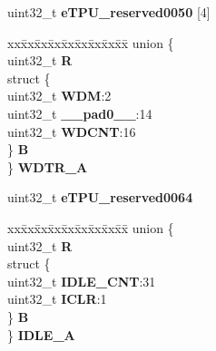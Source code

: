 \begin{DoxyCompactItemize}
\begin{tabbing}
\end{tabbing}\item 
\mbox{\label{structETPU__tag_af12f172b5ea96051013a7c295518d737}} 
uint32\+\_\+t {\bfseries e\+T\+P\+U\+\_\+reserved0050} \mbox{[}4\mbox{]}
\item 
\mbox{\label{structETPU__tag_a9e0bb85c822f6a9f2c32391faf8353b8}} 
\begin{tabbing}
xx\=xx\=xx\=xx\=xx\=xx\=xx\=xx\=xx\=\kill
union \{\\
\>uint32\_t {\bfseries R}\\
\>struct \{\\
\>\>uint32\_t {\bfseries WDM}:2\\
\>\>uint32\_t {\bfseries \_\_pad0\_\_}:14\\
\>\>uint32\_t {\bfseries WDCNT}:16\\
\>\} {\bfseries B}\\
\} {\bfseries WDTR\_A}\\

\end{tabbing}\item 
\mbox{\label{structETPU__tag_af4e785fc7450a16d4077cc53f24f361f}} 
uint32\+\_\+t {\bfseries e\+T\+P\+U\+\_\+reserved0064}
\item 
\mbox{\label{structETPU__tag_a223ec22c9f0ffb2708d12fecfa3572d3}} 
\begin{tabbing}
xx\=xx\=xx\=xx\=xx\=xx\=xx\=xx\=xx\=\kill
union \{\\
\>uint32\_t {\bfseries R}\\
\>struct \{\\
\>\>uint32\_t {\bfseries IDLE\_CNT}:31\\
\>\>uint32\_t {\bfseries ICLR}:1\\
\>\} {\bfseries B}\\
\} {\bfseries IDLE\_A}\\


\end{tabbing}
\end{DoxyCompactItemize}
